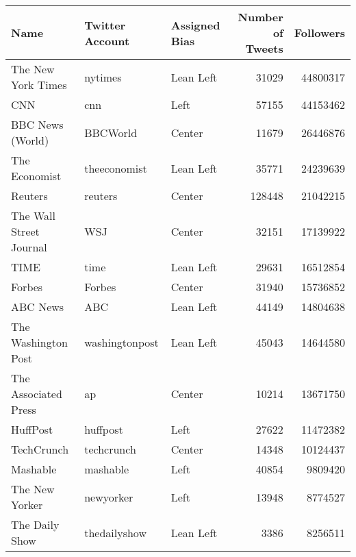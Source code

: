 \begin{center}
\begin{longtable}{lllrr}
\toprule
                                     Name &  Twitter Account & Assigned Bias &  Number of Tweets &  Followers \\
\midrule
                       The New York Times &          nytimes &     Lean Left &             31029 &   44800317 \\
                                      CNN &              cnn &          Left &             57155 &   44153462 \\
                         BBC News (World) &         BBCWorld &        Center &             11679 &   26446876 \\
                            The Economist &     theeconomist &     Lean Left &             35771 &   24239639 \\
                                  Reuters &          reuters &        Center &            128448 &   21042215 \\
                  The Wall Street Journal &              WSJ &        Center &             32151 &   17139922 \\
                                     TIME &             time &     Lean Left &             29631 &   16512854 \\
                                   Forbes &           Forbes &        Center &             31940 &   15736852 \\
                                 ABC News &              ABC &     Lean Left &             44149 &   14804638 \\
                      The Washington Post &   washingtonpost &     Lean Left &             45043 &   14644580 \\
                     The Associated Press &               ap &        Center &             10214 &   13671750 \\
                                 HuffPost &         huffpost &          Left &             27622 &   11472382 \\
                               TechCrunch &       techcrunch &        Center &             14348 &   10124437 \\
                                 Mashable &         mashable &          Left &             40854 &    9809420 \\
                           The New Yorker &        newyorker &          Left &             13948 &    8774527 \\
                           The Daily Show &     thedailyshow &     Lean Left &              3386 &    8256511 \\

\end{longtable}
\end{center}
